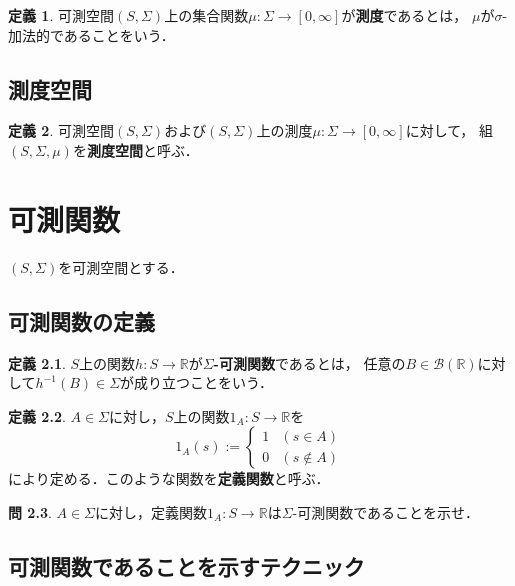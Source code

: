 \documentclass{jsreport}
\theoremstyle{definition}
\newtheorem{defi}{定義}[section]
\newtheorem{qst}[defi]{問}
\begin{document}
\begin{defi}\label{def_measure}
可測空間$(S,\Sigma)$上の集合関数$\mu \colon \Sigma\to[0,\infty]$が\textbf{測度}であるとは，
$\mu$が$\sigma$-加法的であることをいう．
\end{defi}

\section{測度空間}

\begin{defi}\label{def_measure_space}
可測空間$(S,\Sigma)$および$(S,\Sigma)$上の測度$\mu \colon \Sigma\to[0,\infty]$に対して，
組$(S,\Sigma,\mu)$を\textbf{測度空間}と呼ぶ．
\end{defi}

\chapter{可測関数}

$(S,\Sigma)$を可測空間とする．

\section{可測関数の定義}

\begin{defi}\label{def_measurable_function}
$S$上の関数$h \colon S\to\mathbb{R}$が\textbf{$\Sigma$-可測関数}であるとは，
任意の$B\in\mathcal{B}(\mathbb{R})$に対して$h^{-1}(B)\in\Sigma$が成り立つことをいう．
\end{defi}

\begin{defi}\label{def_indicator_function}
$A\in\Sigma$に対し，$S$上の関数$1_A \colon S\to\mathbb{R}$を
\[ 1_A(s):=\begin{cases}1 & (s \in A) \\ 0 & (s \notin A)\end{cases} \]
により定める．このような関数を\textbf{定義関数}と呼ぶ．
\end{defi}

\begin{qst}\label{qst_indicator_function_is_measurable}
$A\in\Sigma$に対し，定義関数$1_A \colon S\to\mathbb{R}$は$\Sigma$-可測関数であることを示せ．
\end{qst}

\section{可測関数であることを示すテクニック}
\end{document}
